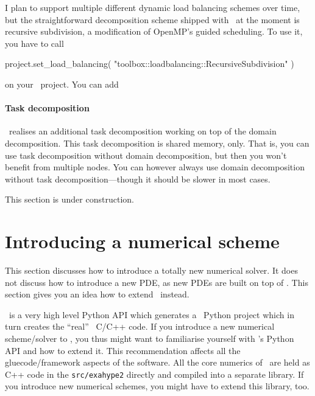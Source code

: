 I plan to support multiple different dynamic load balancing schemes over time,
but the straightforward decomposition scheme shipped with \Peano\ at the moment
is recursive subdivision, a modification of OpenMP's guided scheduling.
To use it, you have to call
\begin{code}
project.set_load_balancing( "toolbox::loadbalancing::RecursiveSubdivision" )
\end{code}

\noindent
on your \ExaHyPE\ project. You can add  


\paragraph{Task decomposition}
\ExaHyPE\ realises an additional task decomposition working on top of the domain
decomposition. 
This task decomposition is shared memory, only.
That is, you can use task decomposition without domain decomposition, but then
you won't benefit from multiple nodes.
You can however always use domain decomposition without task
decomposition---though it should be slower in most cases.

\begin{remark}
This section is under construction.
\end{remark} 


\section{Introducing a numerical scheme}

This section discusses how to introduce a totally new numerical solver. 
It does not discuss how to introduce a new PDE, as new PDEs are built on top of
\ExaHyPE.
This section gives you an idea how to extend \ExaHyPE\ instead.

\begin{remark}
  \ExaHyPE\ is a very high level Python API which generates a \Peano\
   Python project which in turn creates the ``real'' \Peano\ C/C++ code. If you
   introduce a new numerical scheme/solver to \ExaHyPE, you thus might want to
   familiarise yourself with \Peano's Python API and how to extend it. This
   recommendation affects all the gluecode/framework aspects of the software.
   All the core numerics of \ExaHyPE\ are held as C++ code in the
   \texttt{src/exahype2} directly and compiled into a separate library. If you
   introduce new numerical schemes, you might have to extend this library, too.
\end{remark}


